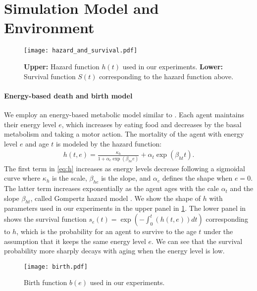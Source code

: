 \section{Simulation Model and Environment}\label{sec:method}

\begin{figure}[t]
  \centering{}
  \texttt{[image: hazard\_and\_survival.pdf]}
  \caption{
    \textbf{Upper:} Hazard function $h(t)$ used in our experiments.
    \textbf{Lower:} Survival function $S(t)$ corresponding to the hazard function above.
  }\label{figure:hs}
\end{figure}

\paragraph{Energy-based death and birth model}
We employ an energy-based metabolic model similar to \citet{hamonEcoevolutionaryDynamicsNonepisodic2023}. Each agent maintains their energy level $e$, which increases by eating food and decreases by the basal metabolism and taking a motor action.
The mortality of the agent with energy level $e$ and age $t$ is modeled by the hazard function:
\begin{align}
  h(t, e) = \frac{\kappa_{h}}{1 + \alpha_{e}\exp(\beta_{he}e)} + \alpha_{t} \exp(\beta_{ht} t).
  \label{eq:h}
\end{align}
The first term in \cref{eq:h} increases as energy levels decrease following a sigmoidal curve where $\kappa_{h}$ is the scale, $\beta_{he}$ is the slope, and $\alpha_{e}$ defines the shape when $e=0$. The latter term increases exponentially as the agent ages with the cale $\alpha_{t}$ and the slope $\beta_{ht}$, called Gompertz hazard model \citep{gompertzXXIVNatureFunction1825,kirkwoodDecipheringDeathCommentary2015}.
We show the shape of $h$ with parameters used in our experiments in the upper panel in \cref{figure:hs}. The lower panel in  shows the survival function $s_{e}(t) = \exp (-\int_{0}^{t}(h(t, e)) dt)$ corresponding to $h$, which is the probability for an agent to survive to the age $t$ under the assumption that it keeps the same energy level $e$. We can see that the survival probability more sharply decays with aging when the energy level is low.

\begin{figure}[t]
  \centering{}
  \texttt{[image: birth.pdf]}
  \caption{Birth function $b(e)$ used in our experiments.}\label{figure:birth}
\end{figure}

